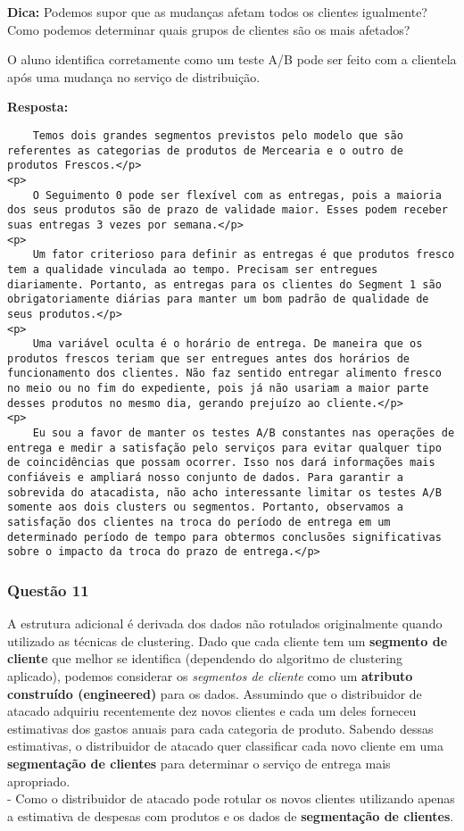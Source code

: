\documentclass[11pt]{article}
\begin{document}
\textbf{Dica:} Podemos supor que as mudanças afetam todos os clientes
igualmente? Como podemos determinar quais grupos de clientes são os mais
afetados?

     O aluno identifica corretamente como um teste A/B pode ser feito com a
clientela após uma mudança no serviço de distribuição. 

    \textbf{Resposta:}

\begin{verbatim}
    Temos dois grandes segmentos previstos pelo modelo que são referentes as categorias de produtos de Mercearia e o outro de produtos Frescos.</p>
<p>
    O Seguimento 0 pode ser flexível com as entregas, pois a maioria dos seus produtos são de prazo de validade maior. Esses podem receber suas entregas 3 vezes por semana.</p>
<p>
    Um fator criterioso para definir as entregas é que produtos fresco tem a qualidade vinculada ao tempo. Precisam ser entregues diariamente. Portanto, as entregas para os clientes do Segment 1 são obrigatoriamente diárias para manter um bom padrão de qualidade de seus produtos.</p>
<p>
    Uma variável oculta é o horário de entrega. De maneira que os produtos frescos teriam que ser entregues antes dos horários de funcionamento dos clientes. Não faz sentido entregar alimento fresco no meio ou no fim do expediente, pois já não usariam a maior parte desses produtos no mesmo dia, gerando prejuízo ao cliente.</p>
<p>
    Eu sou a favor de manter os testes A/B constantes nas operações de entrega e medir a satisfação pelo serviços para evitar qualquer tipo de coincidências que possam ocorrer. Isso nos dará informações mais confiáveis e ampliará nosso conjunto de dados. Para garantir a sobrevida do atacadista, não acho interessante limitar os testes A/B somente aos dois clusters ou segmentos. Portanto, observamos a satisfação dos clientes na troca do período de entrega em um determinado período de tempo para obtermos conclusões significativas sobre o impacto da troca do prazo de entrega.</p>
\end{verbatim}

    \subsubsection{Questão 11}\label{questuxe3o-11}

A estrutura adicional é derivada dos dados não rotulados originalmente
quando utilizado as técnicas de clustering. Dado que cada cliente tem um
\textbf{segmento de cliente} que melhor se identifica (dependendo do
algoritmo de clustering aplicado), podemos considerar os \emph{segmentos
de cliente} como um \textbf{atributo construído (engineered)} para os
dados. Assumindo que o distribuidor de atacado adquiriu recentemente dez
novos clientes e cada um deles forneceu estimativas dos gastos anuais
para cada categoria de produto. Sabendo dessas estimativas, o
distribuidor de atacado quer classificar cada novo cliente em uma
\textbf{segmentação de clientes} para determinar o serviço de entrega
mais apropriado.\\
- Como o distribuidor de atacado pode rotular os novos clientes
utilizando apenas a estimativa de despesas com produtos e os dados de
\textbf{segmentação de clientes}.
\end{document}
